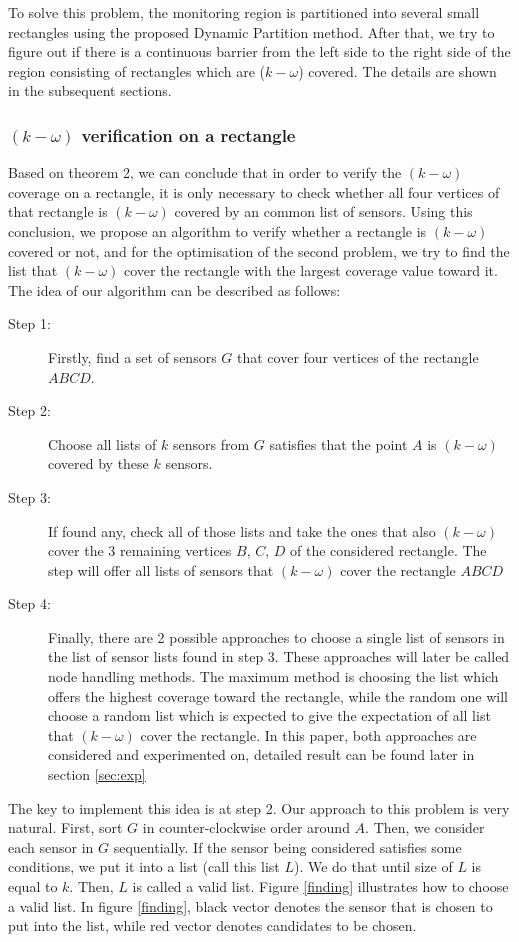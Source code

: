 To solve this problem, the monitoring region is partitioned into several small rectangles using the proposed Dynamic Partition method. After that, we try to figure out if there is a continuous barrier from the left side to the right side of the region consisting of rectangles which are ($k-\omega$) covered. The details are shown in the subsequent sections.

\subsubsection{$(k-\omega)$ verification on a rectangle}

Based on theorem 2, we can conclude that in order to verify the $(k-\omega)$ coverage on a rectangle, it is only necessary to check whether all four vertices of that rectangle is $(k-\omega)$ covered by an common list of sensors. Using this conclusion, we propose an algorithm to verify whether a rectangle is $(k-\omega)$ covered or not, and for the optimisation of the second problem, we try to find the list that $(k-\omega)$ cover the rectangle with the largest coverage value toward it. 
The idea of our algorithm can be described as follows:
\begin{description}
	\item[Step 1:] Firstly, find a set of sensors $G$ that cover four vertices of the rectangle $ ABCD $.
	\item[Step 2:] Choose all lists of $k$ sensors from $G$ satisfies that the point $A$ is $(k-\omega)$ covered by these $k$ sensors.
	\item[Step 3:] If found any, check all of those lists and take the ones that also $(k-\omega)$ cover the 3 remaining vertices $B$, $C$, $D$ of the considered rectangle. The step will offer all lists of sensors that $(k-\omega)$ cover the rectangle $ABCD$
	\item[Step 4:] Finally, there are 2 possible approaches to choose a single list of sensors in the list of sensor lists found in step 3. These approaches will later be called node handling methods. The maximum method is choosing the list which offers the highest coverage toward the rectangle, while the random one will choose a random list which is expected to give the expectation of all list that $(k-\omega)$ cover the rectangle. In this paper, both approaches are considered and experimented on, detailed result can be found later in section \ref{sec:exp}
\end{description}
The key to implement this idea is at step 2. Our approach to this problem is very natural. First, sort $G$ in counter-clockwise order around $A$. Then, we consider each sensor in $G$ sequentially. If the sensor being considered satisfies some conditions, we put it into a list (call this list $L$). We do that until size of $L$ is equal to $k$. Then, $L$ is called a valid list. Figure \ref{finding} illustrates how to choose a valid list. In figure \ref{finding}, black vector denotes the sensor that is chosen to put into the list, while red vector denotes candidates to be chosen.

